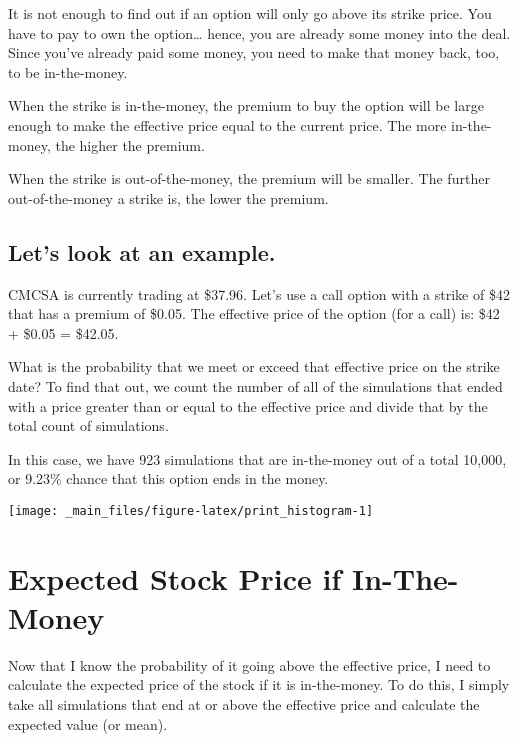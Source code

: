 \documentclass[
]{book}
\begin{document}
It is not enough to find out if an option will only go above its strike price.
You have to pay to own the option\ldots{} hence, you are already some money into the
deal. Since you've already paid some money, you need to make that money back,
too, to be in-the-money.

When the strike is in-the-money, the premium to buy the option will be large
enough to make the effective price equal to the current price. The more
in-the-money, the higher the premium.

When the strike is out-of-the-money, the premium will be smaller. The further
out-of-the-money a strike is, the lower the premium.

\hypertarget{lets-look-at-an-example.}{%
\subsection{Let's look at an example.}\label{lets-look-at-an-example.}}

CMCSA is currently trading at \$37.96. Let's use a call option
with a strike of \$42 that has a premium of \$0.05. The effective price of the
option (for a call) is: \$42 + \$0.05 = \$42.05.

What is the probability that we meet or exceed that effective price on the
strike date? To find that out, we count the number of all of the simulations
that ended with a price greater than or equal to the effective price and divide
that by the total count of simulations.

In this case, we have 923 simulations that are in-the-money
out of a total 10,000, or
9.23\% chance that this
option ends in the money.

\begin{center}\texttt{[image: \_main\_files/figure-latex/print\_histogram-1]} \end{center}

\hypertarget{expected-stock-price-if-in-the-money}{%
\section{Expected Stock Price if In-The-Money}\label{expected-stock-price-if-in-the-money}}

Now that I know the probability of it going above the effective price, I need to
calculate the expected price of the stock if it is in-the-money. To do this, I
simply take all simulations that end at or above the effective price and
calculate the expected value (or mean).
\end{document}
